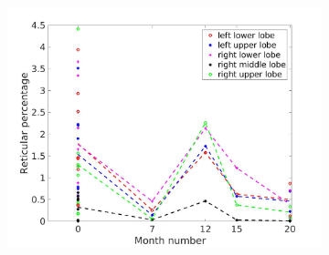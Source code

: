 \begin{figure}[htbp]
\begin{subfigure}{.46\linewidth}
  \includegraphics[width=\linewidth,trim={{.0\wd0} {.0\wd0} {.0\wd0} {.0\wd0}},clip]{QuantitativeAnalysis/Image/ReticularLobarRegionDiseaseDistributionAverage.jpg}
  \caption{}
  \label{fig:LobarRegionDiseaseDistributionAverage-b}
\end{subfigure}
\begin{subfigure}{.46\linewidth}%

\end{subfigure}
\end{figure}
